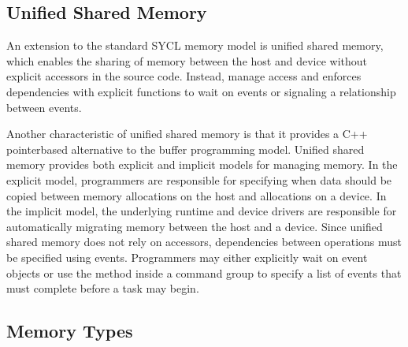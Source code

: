 \documentclass[letterpaper,10pt,english]{sphinxmanual}
\begin{document}
\subsection{Unified Shared Memory}
\label{\detokenize{programming-model/unified-shared-memory:unified-shared-memory}}\label{\detokenize{programming-model/unified-shared-memory:id1}}\label{\detokenize{programming-model/unified-shared-memory::doc}}
An extension to the standard SYCL memory model is unified shared memory,
which enables the sharing of memory between the host and device without
explicit accessors in the source code. Instead, manage access and
enforces dependencies with explicit functions to wait on events or
signaling a  relationship between events.

Another characteristic of unified shared memory is that it provides a
C++ pointer\sphinxhyphen{}based alternative to the buffer programming model. Unified
shared memory provides both explicit and implicit models for managing
memory. In the explicit model, programmers are responsible for
specifying when data should be copied between memory allocations on the
host and allocations on a device. In the implicit model, the underlying
runtime and device drivers are responsible for automatically migrating
memory between the host and a device. Since unified shared memory does
not rely on accessors, dependencies between operations must be specified
using events. Programmers may either explicitly wait on event objects or
use the  method inside a command group to specify a list
of events that must complete before a task may begin.


\subsection{Memory Types}
\label{\detokenize{programming-model/memory-types:memory-types}}\label{\detokenize{programming-model/memory-types:id1}}\label{\detokenize{programming-model/memory-types::doc}}
\end{document}

